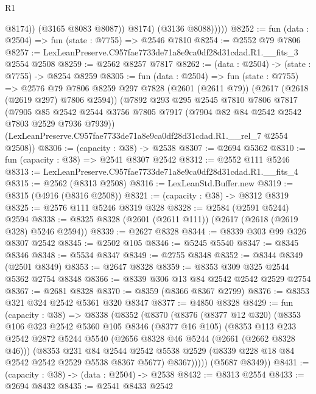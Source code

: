 \begin{lexlean}{R1}
\begin{coremodule}
                    @8174))
                (@3165 @8083 @8087))
              @8174)
            (@3136 @8088)))))
@8252 := fun (data : @2504) => fun (state : @7755) => @2546 @7810
@8254 := @2552 @79 @7806
@8257 := LexLeanPreserve.C957fae7733de71a8e9ca0df28d31cdad.R1.__fits_3 @2554 @2508
@8259 := @2562 @8257 @7817
@8262 := (data : @2504) -> (state : @7755) -> @8254 @8259
@8305 := fun (data : @2504) =>
  fun (state : @7755) =>
  @2576
    @79
    @7806
    @8259
    @297
    @7828
    (@2601 (@2611 @79))
    (@2617 (@2618 (@2619 @297) @7806 @2594))
    (@7892
      @293
      @295
      @2545
      @7810
      @7806
      @7817
      (@7905 @85 @2542 @2544 @3756 @7805 @7917 (@7904 @82 @84 @2542 @2542 @7803 @2529 @7936 @7939))
      (LexLeanPreserve.C957fae7733de71a8e9ca0df28d31cdad.R1.__rel_7 @2554 @2508))
@8306 := (capacity : @38) -> @2538
@8307 := @2694 @5362
@8310 := fun (capacity : @38) => @2541 @8307 @2542
@8312 := @2552 @111 @5246
@8313 := LexLeanPreserve.C957fae7733de71a8e9ca0df28d31cdad.R1.__fits_4
@8315 := @2562 (@8313 @2508)
@8316 := LexLeanStd.Buffer.new
@8319 := @8315 (@4916 (@8316 @2508))
@8321 := (capacity : @38) -> @8312 @8319
@8325 := @2576 @111 @5246 @8319 @328
@8328 := @2584 (@2591 @5244) @2594
@8338 := @8325 @8328 (@2601 (@2611 @111)) (@2617 (@2618 (@2619 @328) @5246 @2594))
@8339 := @2627 @8328
@8344 := @8339 @303 @99 @326 @8307 @2542
@8345 := @2502 @105
@8346 := @5245 @5540
@8347 := @8345 @8346
@8348 := @5534 @8347
@8349 := @2755 @8348
@8352 := @8344 @8349 (@2501 @8349)
@8353 := @2647 @8328
@8359 := @8353 @309 @325 @2544 @5362 @2754 @8348
@8366 := @8339 @306 @13 @84 @2542 @2542 @2529 @2754
@8367 := @2681 @8328
@8370 := @8359 (@8366 @8367 @2799)
@8376 := @8353 @321 @324 @2542 @5361 @320 @8347
@8377 := @4850 @8328
@8429 := fun (capacity : @38) =>
  @8338
    (@8352
      (@8370
        (@8376
          (@8377 @12 @320)
          (@8353
            @106
            @323
            @2542
            @5360
            @105
            @8346
            (@8377 @16 @105)
            (@8353
              @113
              @233
              @2542
              @2872
              @5244
              @5540
              (@2656 @8328 @46 @5244 (@2661 (@2662 @8328 @46)))
              (@8353
                @231
                @84
                @2544
                @2542
                @5538
                @2529
                (@8339 @228 @18 @84 @2542 @2542 @2529 @5538 @8367 @5677)
                @8367)))))
      (@5687 @8349))
@8431 := (capacity : @38) -> (data : @2504) -> @2538
@8432 := @8313 @2554
@8433 := @2694 @8432
@8435 := @2541 @8433 @2542

\end{coremodule}
\end{lexlean}
